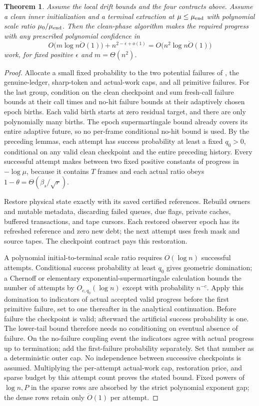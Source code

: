 \documentclass[11pt]{article}
\newtheorem{theorem}{Theorem}[section]
\theoremstyle{remark}
\renewcommand{\O}{\ddot{O}}
\begin{document}
\begin{theorem}
\label{thm:ram-phase-composition}
Assume the local drift bounds and the four contracts above.
Assume a clean inner initialization and a terminal extraction at $\mu\le\mu_{\rm
end}$ with polynomial scale ratio $\mu_0/\mu_{\rm end}$.
Then the clean-phase algorithm makes the required progress with any prescribed
polynomial confidence in
\[
 O\bigl(m\log n\O(1)\bigr)
       +n^{2-\epsilon+o(1)}
 =O\bigl(n^2\log n\O(1)\bigr)
\]
work, for fixed positive $\epsilon$ and $m=\Theta(n^2)$.
\end{theorem} \begin{proof} Allocate a small fixed probability to the two
potential failures of , the
genuine-ledger, sharp-token and actual-work caps, and all primitive failures.
For the last group, condition on the clean checkpoint and sum fresh-call failure
bounds at their call times and no-hit failure bounds at their adaptively chosen
epoch births.
Each valid birth starts at zero residual target, and there are only polynomially
many births.
The epoch supermartingale bound already covers its entire adaptive future, so no
per-frame conditional no-hit bound is used.
By the preceding lemmas, each attempt has success probability at least a fixed
$q_0>0$, conditional on any valid clean checkpoint and the entire preceding
history.
Every successful attempt makes between two fixed positive constants of progress
in $-\log\mu$, because it contains $T$ frames and each actual ratio obeys
$1-\theta=\Theta(\beta_s/\sqrt r)$.

Restore physical state exactly with its saved certified references.
Rebuild owners and mutable metadata, discarding failed queues, due flags,
private caches, buffered transactions, and tape cursors.
Each restored observer epoch has its refreshed reference and zero new debt; the
next attempt uses fresh mask and source tapes.
The checkpoint contract pays this restoration.

A polynomial initial-to-terminal scale ratio requires $O(\log n)$ successful
attempts.
Conditional success probability at least $q_0$ gives geometric domination; a
Chernoff or elementary exponential-supermartingale calculation bounds the number
of attempts by $O_{c,q_0}(\log n)$ except with probability $n^{-c}$.
Apply this domination to indicators of actual accepted valid progress before the
first primitive failure, set to one thereafter in the analytical continuation.
Before failure the checkpoint is valid; afterward the artificial success
probability is one.
The lower-tail bound therefore needs no conditioning on eventual absence of
failure.
On the no-failure coupling event the indicators agree with actual progress up to
termination; add the first-failure probability separately.
Set that number as a deterministic outer cap.
No independence between successive checkpoints is assumed.
Multiplying the per-attempt actual-work cap, restoration price, and sparse
budget by this attempt count proves the stated bound.
Fixed powers of $\log n,P$ in the sparse rows are absorbed by the strict polynomial
exponent gap; the dense rows retain only $\O(1)$ per attempt.


\end{proof}
\end{document}
